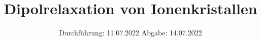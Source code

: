 

\subject{V48}
\title{Dipolrelaxation von Ionenkristallen}
\date{%
  Durchführung: 11.07.2022
  \hspace{3em}
  Abgabe: 14.07.2022
}



\maketitle
\thispagestyle{empty}
\tableofcontents
\newpage





\nocite{*}
\printbibliography{}


